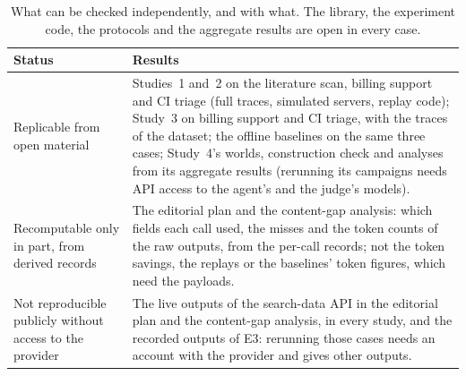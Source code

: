 \begin{table}[h]
\centering\small
\begin{tabular}{p{}p{}}
\toprule
Status & Results \\
\midrule
Replicable from open material & Studies~1 and~2 on the literature scan, billing support and CI triage (full traces,
simulated servers, replay code); Study~3 on billing support and CI triage, with the traces of the dataset; the
offline baselines on the same three cases; Study~4's worlds, construction check and analyses from its aggregate
results (rerunning its campaigns needs API access to the agent's and the judge's models). \\
\addlinespace
Recomputable only in part, from derived records & The editorial plan and the content-gap analysis: which fields each
call used, the misses and the token counts of the raw outputs, from the per-call records; not the token savings, the
replays or the baselines' token figures, which need the payloads. \\
\addlinespace
Not reproducible publicly without access to the provider & The live outputs of the search-data API in the editorial
plan and the content-gap analysis, in every study, and the recorded outputs of E3: rerunning those cases needs an
account with the provider and gives other outputs. \\
\bottomrule
\end{tabular}
\caption{What can be checked independently, and with what. The library, the experiment code, the protocols and
the aggregate results are open in every case.}
\label{tab:availability}
\end{table}
